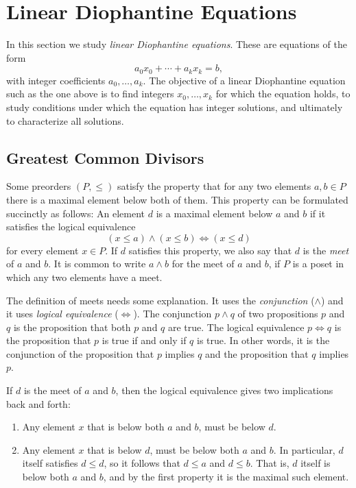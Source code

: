 \chapter{Linear Diophantine Equations}\label{chapter:linear-diophantine-equations}

In this section we study \emph{linear Diophantine equations}. These are equations of the form
\begin{equation*}
  a_0x_0+\cdots +a_kx_k=b,
\end{equation*}
with integer coefficients $a_0,\ldots,a_k$. The objective of a linear Diophantine equation such as the one above is to find integers $x_0,\ldots,x_k$ for which the equation holds, to study conditions under which the equation has integer solutions, and ultimately to characterize all solutions.

\section{Greatest Common Divisors}

Some preorders $(P,\leq)$ satisfy the property that for any two elements $a,b\in P$ there is a maximal element below both of them. This property can be formulated succinctly as follows: An element $d$ is a maximal element below $a$ and $b$ if it satisfies the logical equivalence
\begin{equation*}
  (x \leq a) \land (x \leq b) \Leftrightarrow (x \leq d)
\end{equation*}
for every element $x\in P$. If $d$ satisfies this property, we also say that $d$ is the \emph{meet} of $a$ and $b$. It is common to write $a\wedge b$ for the meet of $a$ and $b$, if $P$ is a poset in which any two elements have a meet.

The definition of meets needs some explanation. It uses the \emph{conjunction} ($\land$) and it uses \emph{logical equivalence} ($\Leftrightarrow$). The conjunction $p\land q$ of two propositions $p$ and $q$ is the proposition that both $p$ and $q$ are true. The logical equivalence $p \Leftrightarrow q$ is the proposition that $p$ is true if and only if $q$ is true. In other words, it is the conjunction of the proposition that $p$ implies $q$ and the proposition that $q$ implies $p$.

If $d$ is the meet of $a$ and $b$, then the logical equivalence gives two implications back and forth:
\begin{enumerate}
\item Any element $x$ that is below both $a$ and $b$, must be below $d$.
\item Any element $x$ that is below $d$, must be below both $a$ and $b$. In particular, $d$ itself satisfies $d\leq d$, so it follows that $d\leq a$ and $d\leq b$. That is, $d$ itself is below both $a$ and $b$, and by the first property it is the maximal such element.
\end{enumerate}


